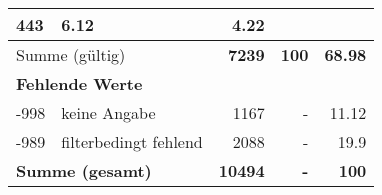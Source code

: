 \begin{longtable}{lXrrr}
       \num{443} &
       \num[round-mode=places,round-precision=2]{6,12} &
         \num[round-mode=places,round-precision=2]{4,22} \\
     \midrule
     \multicolumn{2}{l}{Summe (gültig)} &
       \textbf{\num{7239}} &
     \textbf{100} &
       \textbf{\num[round-mode=places,round-precision=2]{68,98}} \\
     \multicolumn{5}{l}{\textbf{Fehlende Werte}}\\
       -998 &
       keine Angabe &
         \num{1167} &
        - &
         \num[round-mode=places,round-precision=2]{11,12} \\
       -989 &
       filterbedingt fehlend &
         \num{2088} &
        - &
         \num[round-mode=places,round-precision=2]{19,9} \\
     \midrule
     \multicolumn{2}{l}{\textbf{Summe (gesamt)}} &
          \textbf{\num{10494}} &
        \textbf{-} &
        \textbf{100} \\
     \bottomrule
     \end{longtable}
     
